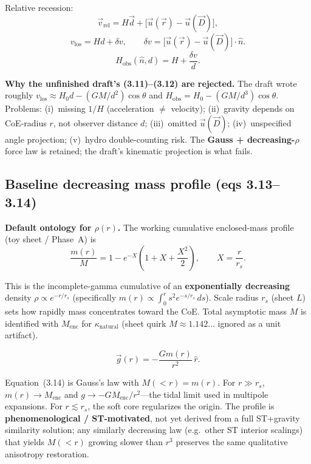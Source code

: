 \documentclass[11pt,a4paper]{article}
\begin{document}
Relative recession:
\[
\vec{v}_{\mathrm{rel}}=H\vec{d}+\bigl[\vec{u}(\vec{r})-\vec{u}(\vec{D})\bigr],
\]
\begin{equation}
v_{\mathrm{los}}=H d+\delta v,\qquad \delta v=\bigl[\vec{u}(\vec{r})-\vec{u}(\vec{D})\bigr]\cdot\hat{n}. \tag{3.11}\label{eq:3.11}
\end{equation}
\begin{equation}
H_{\mathrm{obs}}(\hat{n},d)=H+\frac{\delta v}{d}. \tag{3.12}\label{eq:3.12}
\end{equation}

\textbf{Why the unfinished draft's (3.11)--(3.12) are rejected.} The draft wrote roughly \(v_{\mathrm{los}}\approx H_0 d-(GM/d^2)\cos\theta\) and \(H_{\mathrm{obs}}=H_0-(GM/d^3)\cos\theta\). Problems: (i)~missing \(1/H\) (acceleration \(\neq\) velocity); (ii)~gravity depends on CoE-radius \(r\), not observer distance \(d\); (iii)~omitted \(\vec{u}(\vec{D})\); (iv)~unspecified angle projection; (v)~hydro double-counting risk. The \textbf{Gauss + decreasing-\(\rho\)} force law is retained; the draft's kinematic projection is what fails.

\subsection{Baseline decreasing mass profile (eqs 3.13--3.14)}
\label{sec:profile}

\textbf{Default ontology for \(\rho(r)\).} The working cumulative enclosed-mass profile (toy sheet / Phase~A) is
\begin{equation}
\frac{m(r)}{M}=1-e^{-X}\left(1+X+\frac{X^2}{2}\right),\qquad X=\frac{r}{r_s}. \tag{3.13}\label{eq:3.13}
\end{equation}

This is the incomplete-gamma cumulative of an \textbf{exponentially decreasing} density \(\rho\propto e^{-r/r_s}\) (specifically \(m(r)\propto\int_0^r s^2 e^{-s/r_s}\,ds\)). Scale radius \(r_s\) (sheet \(L\)) sets how rapidly mass concentrates toward the CoE. Total asymptotic mass \(M\) is identified with \(M_{\mathrm{enc}}\) for \(\kappa_{\mathrm{natural}}\) (sheet quirk \(M\approx 1.142\ldots\) ignored as a unit artifact).

\begin{equation}
\vec{g}(r)=-\frac{G m(r)}{r^2}\,\hat{r}. \tag{3.14}\label{eq:3.14}
\end{equation}

Equation~(3.14) is Gauss's law with \(M(<r)=m(r)\). For \(r\gg r_s\), \(m(r)\to M_{\mathrm{enc}}\) and \(g\to -GM_{\mathrm{enc}}/r^2\)---the tidal limit used in multipole expansions. For \(r\lesssim r_s\), the soft core regularizes the origin. The profile is \textbf{phenomenological / ST-motivated}, not yet derived from a full ST+gravity similarity solution; any similarly decreasing law (e.g.\ other ST interior scalings) that yields \(M(<r)\) growing slower than \(r^3\) preserves the same qualitative anisotropy restoration.
\end{document}
